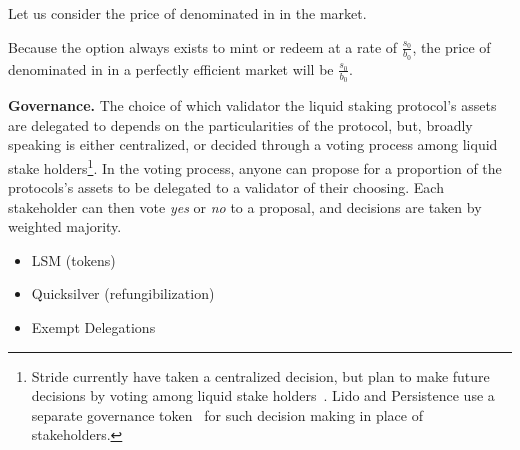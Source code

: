 Let us consider the price of \stasset denominated in \asset in the market.

Because the option always exists to mint or redeem at a rate of $\frac{s_0}{b_0}$,
the price of \stasset denominated in \asset in a perfectly efficient market will be $\frac{s_0}{b_0}$.

%
%
%
%



\noindent
\textbf{Governance.}
The choice of which validator the liquid staking protocol's assets are delegated to
depends on the particularities of the protocol, but, broadly speaking
is either centralized, or decided through a voting process among
liquid stake holders\footnote{Stride currently have
taken a centralized decision, but plan to make future decisions by voting
among liquid stake holders~\cite{stride-validators}. Lido and Persistence
use a separate governance token~\cite{lido-validators,persistence-validators} for
such decision making in place of stakeholders.}.
In the voting process, anyone can propose for a proportion of the protocols's assets
to be delegated to a validator of their choosing.
Each stakeholder can then vote \emph{yes} or \emph{no}
to a proposal, and decisions are taken by weighted majority.

\begin{itemize}
  \item LSM (tokens)
  \item Quicksilver (refungibilization)
  \item Exempt Delegations
\end{itemize}
